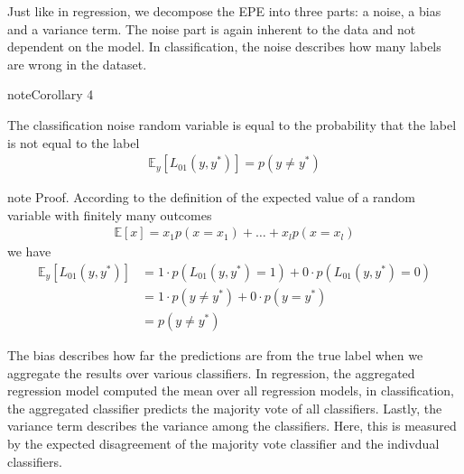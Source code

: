 \documentclass[letterpaper,10pt,english]{jupyterBook}
\begin{document}
\sphinxAtStartPar
Just like in regression, we decompose the EPE into three parts: a noise, a bias and a variance term. The noise part is again inherent to the data and not dependent on the model. In classification, the noise describes how many labels are wrong in the dataset.
\label{classification_evaluation:corollary-1}
\begin{sphinxadmonition}{note}{Corollary 4}



\sphinxAtStartPar
The classification noise random variable is equal to the probability that the label is not equal to the  label
\begin{equation*}
\begin{split}\mathbb{E}_y[L_{01}(y,y^*)]=p(y\neq y^*)\end{split}
\end{equation*}
\end{sphinxadmonition}

\begin{sphinxadmonition}{note}
\sphinxAtStartPar
Proof. According to the definition of the expected value of a random variable with finitely many outcomes
\begin{equation*}
\begin{split}\mathbb{E}[x] = x_1p(x=x_1) + \ldots + x_lp(x=x_l)\end{split}
\end{equation*}
we have
\begin{align*}
\mathbb{E}_y[L_{01}(y,y^*)]&=1\cdot p(L_{01}(y,y^*)=1) + 0\cdot p(L_{01}(y,y^*)=0) \\
&=1\cdot p(y\neq y^*) + 0\cdot p(y=y^*) \\
&=p(y\neq y^*)
\end{align*}\end{sphinxadmonition}

\sphinxAtStartPar
The bias describes how far the predictions are from the true label when we aggregate the results over various classifiers. In regression, the aggregated regression model computed the mean over all regression models, in classification, the aggregated classifier predicts the majority vote of all classifiers. Lastly, the variance term describes the variance among the classifiers. Here, this is measured by the expected disagreement of the majority vote classifier and the indivdual classifiers.
\end{document}
